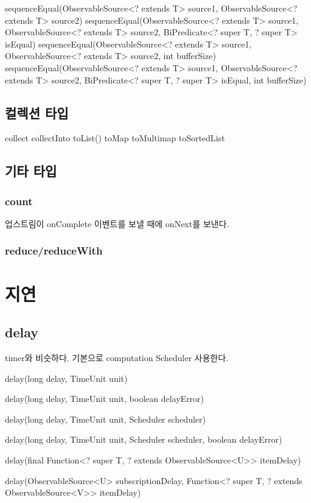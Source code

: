 \documentclass{book}
\begin{document}
{sequenceEqual(ObservableSource<? extends T> source1, ObservableSource<? extends T> source2)
sequenceEqual(ObservableSource<? extends T> source1, ObservableSource<? extends T> source2,
            BiPredicate<? super T, ? super T> isEqual)
            sequenceEqual(ObservableSource<? extends T> source1, ObservableSource<? extends T> source2,
            int bufferSize)
sequenceEqual(ObservableSource<? extends T> source1, ObservableSource<? extends T> source2,
            BiPredicate<? super T, ? super T> isEqual, int bufferSize)

\subsection{컬렉션 타입}
collect
collectInto
toList()
toMap
toMultimap
toSortedList

\subsection{기타 타입}
\subsubsection{count}
업스트림이 onComplete 이벤트를 보낼 때에 onNext를 보낸다.

\subsubsection{reduce/reduceWith}

\section{지연}
\subsection{delay}
timer와 비슷하다.
기본으로 computation Scheduler 사용한다.

delay(long delay, TimeUnit unit)

delay(long delay, TimeUnit unit, boolean delayError)

delay(long delay, TimeUnit unit, Scheduler scheduler)

delay(long delay, TimeUnit unit, Scheduler scheduler, boolean delayError)

delay(final Function<? super T, ? extends ObservableSource<U>> itemDelay)

delay(ObservableSource<U> subscriptionDelay,
            Function<? super T, ? extends ObservableSource<V>> itemDelay)

}
\end{document}
